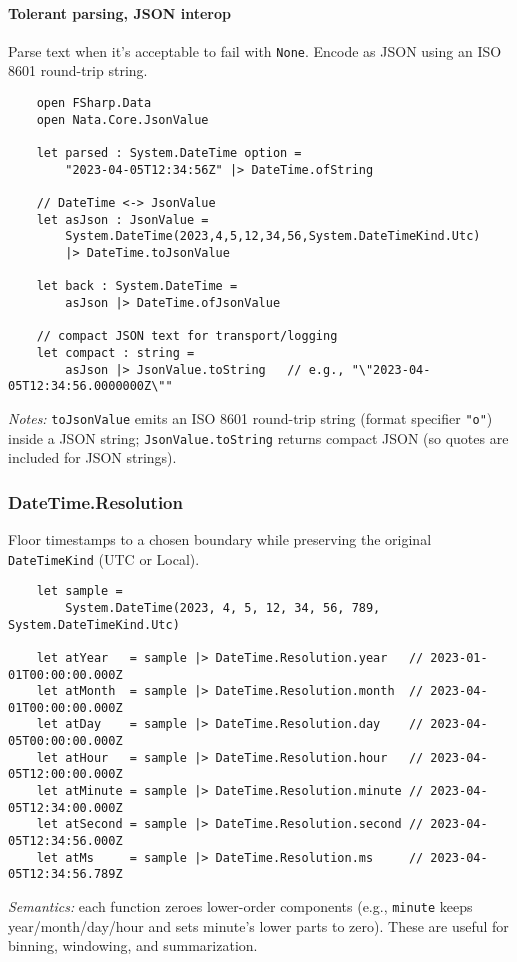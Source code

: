 \documentclass{article}
\begin{document}
\paragraph{Tolerant parsing, JSON interop}
Parse text when it’s acceptable to fail with \texttt{None}. Encode as JSON using an ISO 8601 round-trip string.
\begin{verbatim}
    open FSharp.Data
    open Nata.Core.JsonValue

    let parsed : System.DateTime option =
        "2023-04-05T12:34:56Z" |> DateTime.ofString

    // DateTime <-> JsonValue
    let asJson : JsonValue =
        System.DateTime(2023,4,5,12,34,56,System.DateTimeKind.Utc)
        |> DateTime.toJsonValue

    let back : System.DateTime =
        asJson |> DateTime.ofJsonValue

    // compact JSON text for transport/logging
    let compact : string =
        asJson |> JsonValue.toString   // e.g., "\"2023-04-05T12:34:56.0000000Z\""
\end{verbatim}
\emph{Notes:} \texttt{toJsonValue} emits an ISO 8601 round-trip string (format specifier \texttt{"o"}) inside a JSON string; \texttt{JsonValue.toString} returns compact JSON (so quotes are included for JSON strings).

\subsubsection{DateTime.Resolution}
Floor timestamps to a chosen boundary while preserving the original \texttt{DateTimeKind} (UTC or Local).
\begin{verbatim}
    let sample =
        System.DateTime(2023, 4, 5, 12, 34, 56, 789, System.DateTimeKind.Utc)

    let atYear   = sample |> DateTime.Resolution.year   // 2023-01-01T00:00:00.000Z
    let atMonth  = sample |> DateTime.Resolution.month  // 2023-04-01T00:00:00.000Z
    let atDay    = sample |> DateTime.Resolution.day    // 2023-04-05T00:00:00.000Z
    let atHour   = sample |> DateTime.Resolution.hour   // 2023-04-05T12:00:00.000Z
    let atMinute = sample |> DateTime.Resolution.minute // 2023-04-05T12:34:00.000Z
    let atSecond = sample |> DateTime.Resolution.second // 2023-04-05T12:34:56.000Z
    let atMs     = sample |> DateTime.Resolution.ms     // 2023-04-05T12:34:56.789Z
\end{verbatim}
\emph{Semantics:} each function zeroes lower-order components (e.g., \texttt{minute} keeps year/month/day/hour and sets minute’s lower parts to zero). These are useful for binning, windowing, and summarization.
\end{document}
